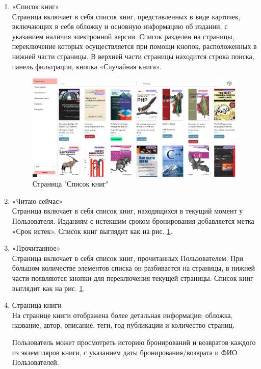 \documentclass[project.tex]{subfiles}
\begin{document}
\begin{enumerate}
    \item «Список книг»\\
    Страница включает в себя список книг, представленных в виде карточек, включающих в себя обложку и основную информацию об издании, с указанием наличия электронной версии.
    Список разделен на страницы, переключение которых осуществляется при помощи кнопок, расположенных в нижней части страницы.
    В верхней части страницы находится строка поиска, панель фильтрации, кнопка «Случайная книга».
    \begin{figure}[H]
        \includegraphics[width=\textwidth, frame]{../../graphics/mainpage.png}
        \caption{Страница "Список книг"}
        \label{pic:main}
    \end{figure}
    \item «Читаю сейчас»\\
    Страница включает в себя список книг, находящихся в текущий момент у Пользователя. Изданиям с истекшим сроком бронирования добавляется метка «Срок истек». Список книг выглядит как на рис. \ref{pic:main}.
    \item «Прочитанное»\\
    Страница включает в себя список книг, прочитанных Пользователем. При большом количестве элементов списка он разбивается на страницы, в нижней части появляются кнопки для переключения текущей страницы. Список книг выглядит как на рис. \ref{pic:main}.
    \item Страница книги\\
    На странице книги отображена более детальная информация: обложка, название, автор, описание, теги, год публикации и количество страниц.
    \par
    Пользователь может просмотреть историю бронирований и возвратов каждого из экземпляров книги, с указанием даты бронирования/возврата и ФИО Пользователей.
    \par

\end{enumerate}
\end{document}
